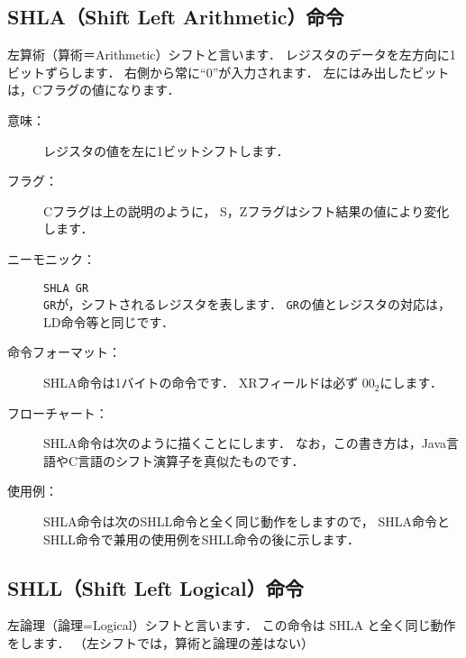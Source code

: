 \subsection{SHLA（Shift Left Arithmetic）命令}
左算術（算術＝Arithmetic）シフトと言います．
レジスタのデータを左方向に1ビットずらします．
右側から常に``0''が入力されます．
左にはみ出したビットは，Cフラグの値になります．

\begin{center}
\end{center}

\begin{description}
\item[意味：]レジスタの値を左に1ビットシフトします．

\item[フラグ：]Cフラグは上の説明のように，
S，Zフラグはシフト結果の値により変化します．

\item[ニーモニック：]{\tt SHLA  GR} \\
{\tt GR}が，シフトされるレジスタを表します．
{\tt GR}の値とレジスタの対応は，LD命令等と同じです．

\item[命令フォーマット：]SHLA命令は1バイトの命令です．
XRフィールドは必ず $00_2$にします．


\item[フローチャート：]SHLA命令は次のように描くことにします．
なお，この書き方は，Java言語やC言語のシフト演算子を真似たものです．

\begin{center}
\end{center}

\item[使用例：] SHLA命令は次のSHLL命令と全く同じ動作をしますので，
SHLA命令とSHLL命令で兼用の使用例をSHLL命令の後に示します．

\end{description}

\newpage
\subsection{SHLL（Shift Left Logical）命令}
左論理（論理=Logical）シフトと言います．
この命令は SHLA と全く同じ動作をします．
（左シフトでは，算術と論理の差はない）

